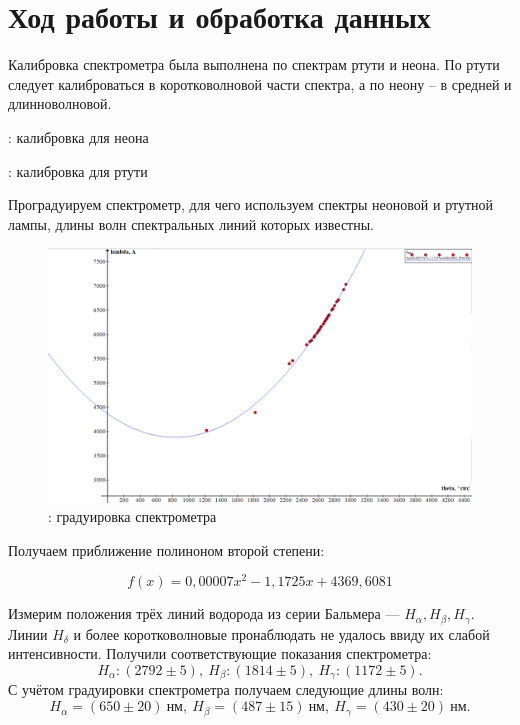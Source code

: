         \newpage

        \section{Ход работы и обработка данных}
        
        Калибровка спектрометра была выполнена по спектрам ртути и неона. По ртути следует калиброваться в коротковолновой части спектра, а по неону -- в средней и длинноволновой.

        \begin{table}[h!]
            \centering
            
            \caption{: калибровка для неона}
        \label{tb1}
        \end{table}
    
        \begin{table}[h!]
            \centering
            
            \caption{: калибровка для ртути}
        \label{tb2}
        \end{table}

		Проградуируем спектрометр, для чего используем спектры неоновой и ртутной лампы, длины волн спектральных линий которых известны. 
		
        \begin{figure}[h!]
            \centering
            \includegraphics[width=1.0\linewidth]{pics/grad.png}
            \caption{ : градуировка спектрометра}
            \label{al}
        \end{figure}
	
        Получаем приближение полиноном второй степени: 
        
        \[ f(x) = 0,00007x^{2} -1,1725x + 4369,6081 \]

		Измерим положения трёх линий водорода из серии Бальмера --- $H_{\alpha}, H_{\beta}, H_{\gamma}$. Линии $H_{\delta}$ и более коротковолновые пронаблюдать не удалось ввиду их слабой интенсивности.	Получили соответствующие показания спектрометра:
		\begin{equation*}
			H_{\alpha}: (2792\pm 5), \  H_{\beta} : (1814 \pm 5), \ H_{\gamma} : (1172 \pm 5).
		\end{equation*}
		С учётом градуировки спектрометра получаем следующие длины волн: 
		\begin{equation*}
			H_{\alpha} = (650\pm 20)\ \text{нм}, \ H_{\beta} = (487\pm 15)\ \text{нм}, \ H_{\gamma} = (430\pm  20)\  \text{нм}.
		\end{equation*}
		
